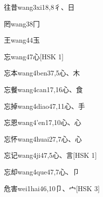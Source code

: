 \begin{entry}{往昔}{wang3xi1}{8,8}{⼻、⽇}
\end{entry}

\begin{entry}{罔}{wang3}{8}{⼌}
\end{entry}

\begin{entry}{王}{wang4}{4}{⽟}
\end{entry}

\begin{entry}{忘}{wang4}{7}{⼼}[HSK 1]
\end{entry}

\begin{entry}{忘本}{wang4ben3}{7,5}{⼼、⽊}
\end{entry}

\begin{entry}{忘餐}{wang4can1}{7,16}{⼼、⾷}
\end{entry}

\begin{entry}{忘掉}{wang4diao4}{7,11}{⼼、⼿}
\end{entry}

\begin{entry}{忘恩}{wang4'en1}{7,10}{⼼、⼼}
\end{entry}

\begin{entry}{忘怀}{wang4huai2}{7,7}{⼼、⼼}
\end{entry}

\begin{entry}{忘记}{wang4ji4}{7,5}{⼼、⾔}[HSK 1]
\end{entry}

\begin{entry}{忘却}{wang4que4}{7,7}{⼼、⼙}
\end{entry}

\begin{entry}{危害}{wei1hai4}{6,10}{⼙、⼧}[HSK 3]
\end{entry}

